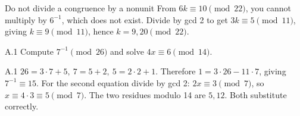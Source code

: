 \documentclass[11pt,a4paper]{article}
\begin{document}
\begin{tip}{Do not divide a congruence by a nonunit}
From \(6k\equiv10\pmod{22}\), you cannot multiply by \(6^{-1}\), which does not exist. Divide by gcd 2 to get \(3k\equiv5\pmod{11}\), giving \(k\equiv9\pmod{11}\), hence \(k=9,20\pmod{22}\).
\end{tip}
\begin{question}{A.1}
Compute \(7^{-1}\pmod{26}\) and solve \(4x\equiv6\pmod{14}\).
\end{question}
\begin{answer}{A.1}
\(26=3\cdot7+5,\ 7=5+2,\ 5=2\cdot2+1\). Therefore \(1=3\cdot26-11\cdot7\), giving \(7^{-1}\equiv15\). For the second equation divide by gcd 2: \(2x\equiv3\pmod7\), so \(x\equiv4\cdot3\equiv5\pmod7\). The two residues modulo 14 are \(5,12\). Both substitute correctly.
\end{answer}
\end{document}
